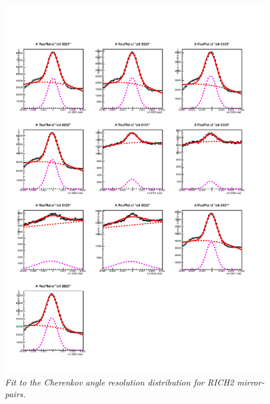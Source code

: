 \begin{figure}[!h]
	\vspace*{-0.cm}
	\begin{center}
		\includegraphics[width=1.\textwidth]{rich2_p8.pdf}
		\vspace*{-1.5cm}
	\end{center}
	\caption{\textit{Fit to the Cherenkov angle resolution distribution for RICH2 mirror-pairs.}}
	\label{fig:rich2p8}
\end{figure}